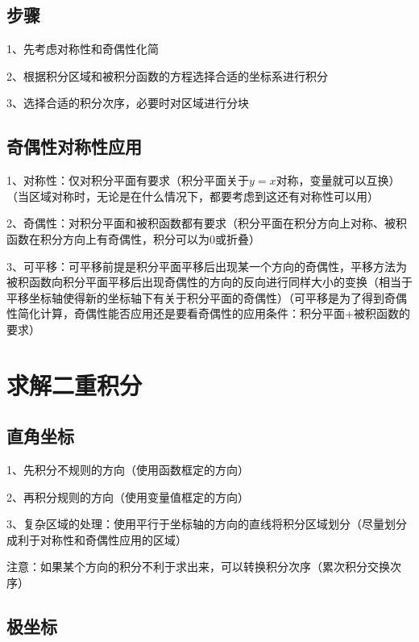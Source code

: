 \subsection{步骤}

1、先考虑对称性和奇偶性化简

2、根据积分区域和被积分函数的方程选择合适的坐标系进行积分

3、选择合适的积分次序，必要时对区域进行分块



\subsection{奇偶性对称性应用}

1、对称性：仅对积分平面有要求（积分平面关于$y=x$对称，变量就可以互换）（当区域对称时，无论是在什么情况下，都要考虑到这还有对称性可以用）

2、奇偶性：对积分平面和被积函数都有要求（积分平面在积分方向上对称、被积函数在积分方向上有奇偶性，积分可以为0或折叠）

3、可平移：可平移前提是积分平面平移后出现某一个方向的奇偶性，平移方法为被积函数向积分平面平移后出现奇偶性的方向的反向进行同样大小的变换（相当于平移坐标轴使得新的坐标轴下有关于积分平面的奇偶性）（可平移是为了得到奇偶性简化计算，奇偶性能否应用还是要看奇偶性的应用条件：积分平面+被积函数的要求）

\section{求解二重积分}



\subsection{直角坐标}

1、先积分不规则的方向（使用函数框定的方向）

2、再积分规则的方向（使用变量值框定的方向）

3、复杂区域的处理：使用平行于坐标轴的方向的直线将积分区域划分（尽量划分成利于对称性和奇偶性应用的区域）

注意：如果某个方向的积分不利于求出来，可以转换积分次序（累次积分交换次序）



\subsection{极坐标}

